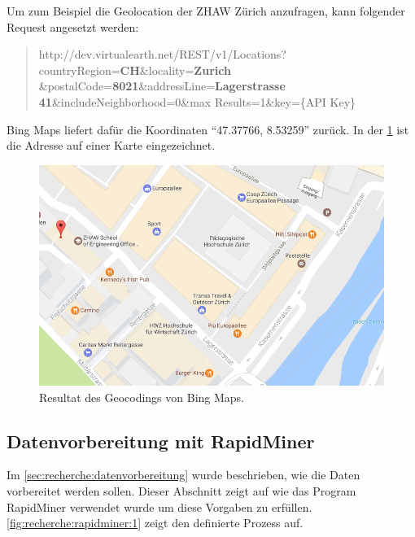 Um zum Beispiel die Geolocation der ZHAW Zürich anzufragen, kann folgender Request angesetzt werden:

\blockquote[]{http://dev.virtualearth.net/REST/v1/Locations?countryRegion=\textbf{CH}\&locality=\textbf{Zurich} \&postalCode=\textbf{8021}\&addressLine=\textbf{Lagerstrasse 41}\&includeNeighborhood=0\&max Results=1\&key=\{API Key\}}

Bing Maps liefert dafür die Koordinaten "`47.37766, 8.53259"' zurück. In der \cref{fig:proofofconcept:datenvorbereitung:datenerweiterung:geolocation:1} ist die Adresse auf einer Karte eingezeichnet.

\begin{figure}[H]
	\RawFloats
	\centering
	\includegraphics[width=1\textwidth]{images/bing-maps-result}
	\caption{Resultat des Geocodings von Bing Maps.}
	\label{fig:proofofconcept:datenvorbereitung:datenerweiterung:geolocation:1}
\end{figure}

\subsection{Datenvorbereitung mit RapidMiner}
Im \cref{sec:recherche:datenvorbereitung} wurde beschrieben, wie die Daten vorbereitet werden sollen. Dieser Abschnitt zeigt auf wie das Program RapidMiner verwendet wurde um diese Vorgaben zu erfüllen. \cref{fig:recherche:rapidminer:1} zeigt den definierte Prozess auf.


